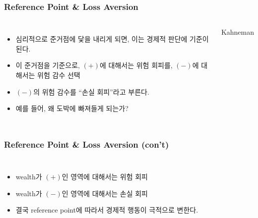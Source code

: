 \documentclass[final]{beamer}
\begin{document}
\begin{frame}\frametitle{Reference Point \& Loss Aversion}\vspace{1.5em}
%
\begin{columns}[c]
\column{18em}
\begin{itemize}
\item 심리적으로 준거점에 닻을 내리게 되면, 이는 경제적 판단에 기준이 된다. 
\item 이 준거점을 기준으로, 
$(+)$에 대해서는 위험 회피를, $(-)$에 대해서는 위험 감수 선택 
\item $(-)$의 위험 감수를 ``손실 회피''라고 부른다.  
\item 예를 들어, 왜 도박에 빠져들게 되는가? 
\end{itemize}
%
\column{12em}
Kahneman
\end{columns}
\end{frame}
%
\begin{frame}\frametitle{Reference Point \& Loss Aversion (con't)}\vspace{3em}
%
\begin{columns}[c]
\column{15em}
\begin{itemize}
\item wealth가 $(+)$인 영역에 대해서는 위험 회피 
\item wealth가 $(-)$인 영역에 대해서는 손실 회피 
\item 결국 reference point에 따라서 경제적 행동이 극적으로 변한다. 
\end{itemize}
%
\column{14em}
\hspace{-1em}
\end{columns}
\end{frame}
%
\end{document}
